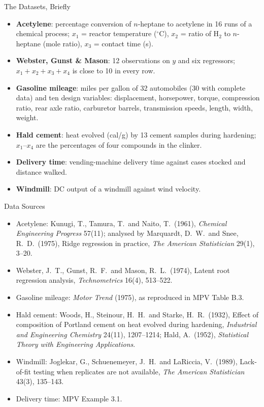 \begin{frame}{The Datasets, Briefly}
    \footnotesize
    \begin{itemize}
        \item \textbf{Acetylene}: percentage conversion of $n$-heptane to acetylene in 16 runs of a chemical process; $x_1$ = reactor temperature ($^\circ$C), $x_2$ = ratio of H$_2$ to $n$-heptane (mole ratio), $x_3$ = contact time (s).
        \item \textbf{Webster, Gunst \& Mason}: 12 observations on $y$ and six regressors; $x_1+x_2+x_3+x_4$ is close to 10 in every row.
        \item \textbf{Gasoline mileage}: miles per gallon of 32 automobiles (30 with complete data) and ten design variables: displacement, horsepower, torque, compression ratio, rear axle ratio, carburetor barrels, transmission speeds, length, width, weight.
        \item \textbf{Hald cement}: heat evolved (cal/g) by 13 cement samples during hardening; $x_1$--$x_4$ are the percentages of four compounds in the clinker.
        \item \textbf{Delivery time}: vending-machine delivery time against cases stocked and distance walked.
        \item \textbf{Windmill}: DC output of a windmill against wind velocity.
    \end{itemize}
\end{frame}


\begin{frame}{Data Sources}
    \footnotesize
    \begin{itemize}
        \setlength{\itemsep}{0.2em}
        \item Acetylene: Kunugi, T., Tamura, T.\ and Naito, T.\ (1961), \emph{Chemical Engineering Progress} 57(11); analysed by Marquardt, D.\ W.\ and Snee, R.\ D.\ (1975), Ridge regression in practice, \emph{The American Statistician} 29(1), 3--20.
        \item Webster, J.\ T., Gunst, R.\ F.\ and Mason, R.\ L.\ (1974), Latent root regression analysis, \emph{Technometrics} 16(4), 513--522.
        \item Gasoline mileage: \emph{Motor Trend} (1975), as reproduced in MPV Table B.3.
        \item Hald cement: Woods, H., Steinour, H.\ H.\ and Starke, H.\ R.\ (1932), Effect of composition of Portland cement on heat evolved during hardening, \emph{Industrial and Engineering Chemistry} 24(11), 1207--1214; Hald, A.\ (1952), \emph{Statistical Theory with Engineering Applications}.
        \item Windmill: Joglekar, G., Schuenemeyer, J.\ H.\ and LaRiccia, V.\ (1989), Lack-of-fit testing when replicates are not available, \emph{The American Statistician} 43(3), 135--143.
        \item Delivery time: MPV Example 3.1.
    \end{itemize}
\end{frame}


